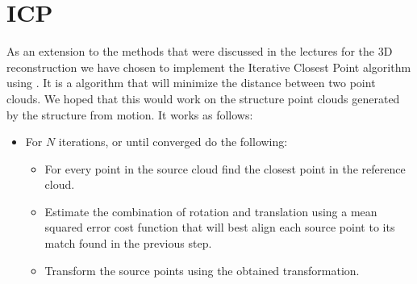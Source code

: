 \section{ICP}
\label{ICP}
As an extension to the methods that were discussed in the lectures for the 3D reconstruction we have chosen to implement the Iterative Closest Point algorithm using . It is a algorithm that will minimize the distance between two point clouds. We hoped that this would work on the structure point clouds generated by the structure from motion. It works as follows:

\begin{itemize}
	\item For $N$ iterations, or until converged do the following:
	\begin{itemize}
		\item For every point in the source cloud find the closest point in the reference cloud.
		\item Estimate the combination of rotation and translation using a mean squared error cost function that will best align each source point to its match found in the previous step.
		\item Transform the source points using the obtained transformation.
	\end{itemize}
\end{itemize}



